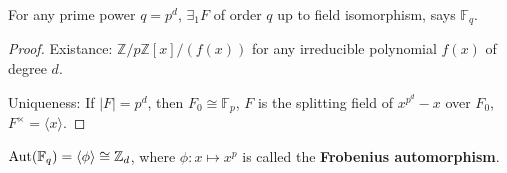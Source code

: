 \documentclass[a4paper,11pt]{article}
\begin{document}
\begin{proposition}
    For any prime power $q=p^d$, $\exists_1 F$ of order $q$ up to field isomorphism, says $\mathbb{F}_q$. 
\end{proposition}
\begin{proof}
    Existance: $\mathbb{Z}/p\mathbb{Z}[x]/(f(x))$ for any irreducible polynomial $f(x)$ of degree $d$.

    Uniqueness: If $|F|=p^d$, then $F_0\cong \mathbb{F}_p$,  $F$ is the splitting field of $x^{p^d}-x$ over $F_0$, $F^\times=\langle x\rangle$. 
\end{proof}

\begin{lemma}
    $\mathrm{Aut}(\mathbb{F}_q)=\langle \phi\rangle\cong\mathbb{Z}_d$, where $\phi:x\mapsto x^p$ is called the \textbf{Frobenius automorphism}.
\end{lemma}


\ifx\ChapThreeSecOne\undefined %
     
\end{document}
